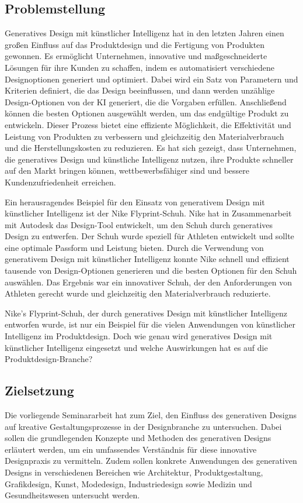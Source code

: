 \subsection*{Problemstellung}
Generatives Design mit künstlicher Intelligenz hat in den letzten Jahren einen großen Einfluss auf das Produktdesign und 
die Fertigung von Produkten gewonnen. Es ermöglicht Unternehmen, innovative und maßgeschneiderte Lösungen für ihre Kunden 
zu schaffen, indem es automatisiert verschiedene Designoptionen generiert und optimiert. Dabei wird ein Satz von Parametern 
und Kriterien definiert, die das Design beeinflussen, und dann werden unzählige Design-Optionen von der KI generiert, die die 
Vorgaben erfüllen. Anschließend können die besten Optionen ausgewählt werden, um das endgültige Produkt zu entwickeln.
Dieser Prozess bietet eine effiziente Möglichkeit, die Effektivität und Leistung von Produkten zu verbessern und gleichzeitig 
den Materialverbrauch und die Herstellungskosten zu reduzieren. Es hat sich gezeigt, dass Unternehmen, die generatives Design 
und künstliche Intelligenz nutzen, ihre Produkte schneller auf den Markt bringen können, wettbewerbsfähiger sind und bessere 
Kundenzufriedenheit erreichen.

Ein herausragendes Beispiel für den Einsatz von generativem Design mit künstlicher Intelligenz ist der Nike Flyprint-Schuh. 
Nike hat in Zusammenarbeit mit Autodesk das Design-Tool entwickelt, um den Schuh durch generatives Design zu entwerfen. Der 
Schuh wurde speziell für Athleten entwickelt und sollte eine optimale Passform und Leistung bieten. Durch die Verwendung von 
generativem Design mit künstlicher Intelligenz konnte Nike schnell und effizient tausende von Design-Optionen generieren und 
die besten Optionen für den Schuh auswählen. Das Ergebnis war ein innovativer Schuh, der den Anforderungen von Athleten gerecht
 wurde und gleichzeitig den Materialverbrauch reduzierte. 

Nike's Flyprint-Schuh, der durch generatives Design mit künstlicher Intelligenz entworfen wurde, ist nur ein Beispiel für die 
vielen Anwendungen von künstlicher Intelligenz im Produktdesign. Doch wie genau wird generatives Design mit künstlicher Intelligenz
eingesetzt und welche Auswirkungen hat es auf die Produktdesign-Branche?

\subsection*{Zielsetzung}
Die vorliegende Seminararbeit hat zum Ziel, den Einfluss des generativen Designs auf kreative Gestaltungsprozesse in der Designbranche zu untersuchen. Dabei sollen die grundlegenden Konzepte und Methoden des generativen Designs erläutert werden, um ein umfassendes Verständnis für diese innovative Designpraxis zu vermitteln. Zudem sollen konkrete Anwendungen des generativen Designs in verschiedenen Bereichen wie Architektur, Produktgestaltung, Grafikdesign, Kunst, Modedesign, Industriedesign sowie Medizin und Gesundheitswesen untersucht werden. 

